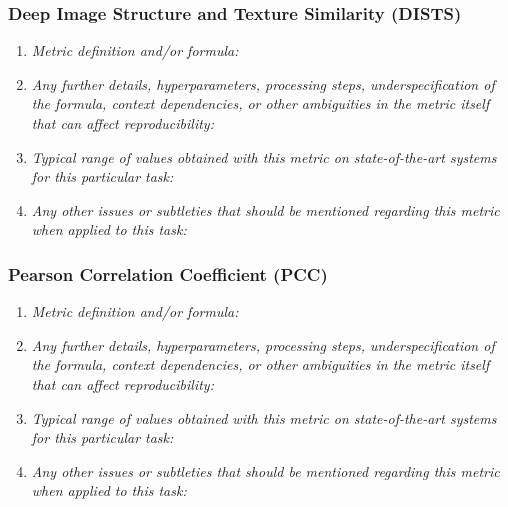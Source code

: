 \documentclass[a4paper,11pt]{article}
\begin{document}
        \subsubsection{Deep Image Structure and Texture Similarity (DISTS)}
            \begin{enumerate}[label=\alph*.]
                \item \textit{Metric definition and/or formula:}
                \bigskip
                \item \textit{Any further details, hyperparameters, processing steps, underspecification of the formula, context dependencies, or other ambiguities in the metric itself that can affect reproducibility:}
                \bigskip
                \item \textit{Typical range of values obtained with this metric on state-of-the-art systems for this particular task:}
                \bigskip
                \item \textit{Any other issues or subtleties that should be mentioned regarding this metric when applied to this task:}
                \bigskip
            \end{enumerate}
        \subsubsection{Pearson Correlation Coefficient (PCC)}
            \begin{enumerate}[label=\alph*.]
                \item \textit{Metric definition and/or formula:}
                \bigskip
                \item \textit{Any further details, hyperparameters, processing steps, underspecification of the formula, context dependencies, or other ambiguities in the metric itself that can affect reproducibility:}
                \bigskip
                \item \textit{Typical range of values obtained with this metric on state-of-the-art systems for this particular task:}
                \bigskip
                \item \textit{Any other issues or subtleties that should be mentioned regarding this metric when applied to this task:}
                \bigskip
            \end{enumerate}
\end{document}
